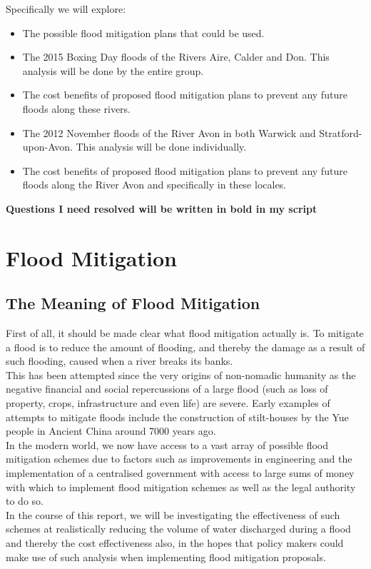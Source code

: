 \documentclass[11 pt, a4paper]{article}
\begin{document}
Specifically we will explore:\\
\begin{framed}
\begin{itemize}
\item The possible flood mitigation plans that could be used.
\item The 2015 Boxing Day floods of the Rivers Aire, Calder and Don. This analysis will be done by the entire group.
\item The cost benefits of proposed flood mitigation plans to prevent any future floods along these rivers.
\item The 2012 November floods of the River Avon in both Warwick and Stratford-upon-Avon. This analysis will be done individually.
\item The cost benefits of proposed flood mitigation plans to prevent any future floods along the River Avon and specifically in these locales.
\end{itemize}
\end{framed}
{\bf Questions I need resolved will be written in bold in my script}


\newpage
\section{Flood Mitigation}
\subsection{The Meaning of Flood Mitigation}
First of all, it should be made clear what flood mitigation actually is. To mitigate a flood is to reduce the amount of flooding, and thereby the damage as a result of such flooding, caused when a river breaks its banks.\\ 
This has been attempted since the very origins of non-nomadic humanity as the negative financial and social repercussions of a large flood (such as loss of property, crops, infrastructure and even life) are severe. Early examples of attempts to mitigate floods include the construction of stilt-houses by the Yue people in Ancient China around 7000 years ago.\cite{3}\\ 
In the modern world, we now have access to a vast array of possible flood mitigation schemes due to factors such as improvements in engineering and the implementation of a centralised  government with access to large sums of money with which to implement flood mitigation schemes as well as the legal authority to do so.\\
In the course of this report, we will be investigating the effectiveness of such schemes at realistically reducing the volume of water discharged during a flood and thereby the cost effectiveness also, in the hopes that policy makers could make use of such analysis when implementing flood mitigation proposals.
\end{document}

